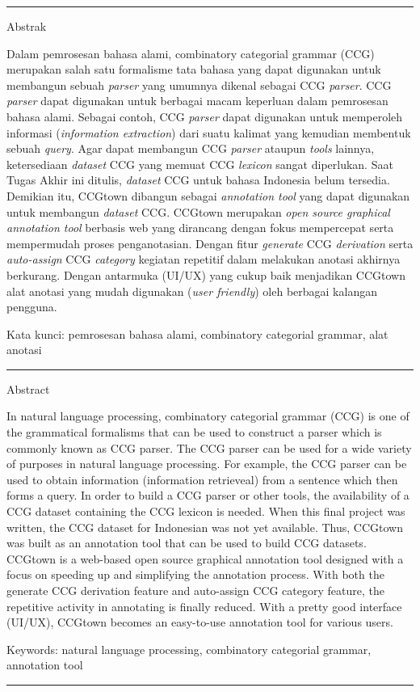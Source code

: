 {\bf \parindent0pt \noindent\rule{\textwidth}{1pt}
Abstrak

Dalam pemrosesan bahasa alami, combinatory categorial grammar (CCG) merupakan salah satu
formalisme tata bahasa yang dapat digunakan untuk membangun sebuah \textit{parser} yang umumnya
dikenal sebagai CCG \textit{parser}.
CCG \textit{parser} dapat digunakan untuk berbagai macam keperluan dalam pemrosesan bahasa alami.
Sebagai contoh, CCG \textit{parser} dapat digunakan untuk memperoleh informasi
(\textit{information extraction}) dari suatu kalimat yang kemudian membentuk sebuah \textit{query}.
Agar dapat membangun CCG \textit{parser} ataupun \textit{tools} lainnya, ketersediaan
\textit{dataset} CCG yang memuat CCG \textit{lexicon} sangat diperlukan. Saat Tugas Akhir ini
ditulis, \textit{dataset} CCG untuk bahasa Indonesia belum tersedia. Demikian itu, CCGtown dibangun
sebagai \textit{annotation tool} yang dapat digunakan untuk membangun \textit{dataset} CCG.
CCGtown merupakan \textit{open source graphical annotation tool} berbasis web yang dirancang
dengan fokus mempercepat serta mempermudah proses penganotasian.
Dengan fitur \textit{generate} CCG \textit{derivation} serta \textit{auto-assign} CCG
\textit{category} kegiatan repetitif dalam melakukan anotasi akhirnya berkurang.
Dengan antarmuka (UI/UX) yang cukup baik menjadikan CCGtown alat anotasi yang mudah digunakan
(\textit{user friendly}) oleh berbagai kalangan pengguna.

\bigskip
Kata kunci: pemrosesan bahasa alami, combinatory categorial grammar, alat anotasi






\noindent\rule{\textwidth}{1pt}
Abstract

In natural language processing, combinatory categorial grammar (CCG) is one of the grammatical
formalisms that can be used to construct a parser which is commonly known as CCG parser.
The CCG parser can be used for a wide variety of purposes in natural language processing.
For example, the CCG parser can be used to obtain information (information retrieveal) from a
sentence which then forms a query. In order to build a CCG parser or other tools, the availability
of a CCG dataset containing the CCG lexicon is needed. When this final project was written, the CCG
dataset for Indonesian was not yet available. Thus, CCGtown was built as an annotation tool that can
be used to build CCG datasets. CCGtown is a web-based open source graphical annotation tool designed
with a focus on speeding up and simplifying the annotation process.
With both the generate CCG derivation feature and auto-assign CCG category feature, the repetitive
activity in annotating is finally reduced. With a pretty good interface (UI/UX), CCGtown becomes
an easy-to-use annotation tool for various users.

\bigskip
Keywords: natural language processing, combinatory categorial grammar, annotation tool

\noindent\rule{\textwidth}{1pt} }
   


